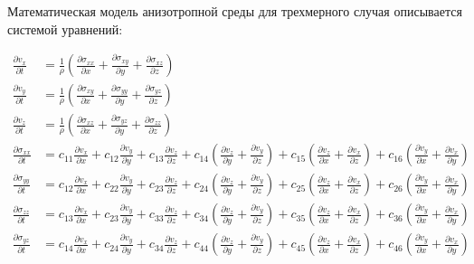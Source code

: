 	Математическая модель анизотропной среды для трехмерного случая описывается системой уравнений\cite{favorskaya}:
\begin{small}
\begin{align}
	\label{anisotropic_equations}
	\frac{\partial{v_x}}{\partial{t}}&=\frac{1}{\rho}(\frac{\partial{\sigma_{xx}}}{\partial{x}}+\frac{\partial{\sigma_{xy}}}{\partial{y}}+\frac{\partial{\sigma_{xz}}}{\partial{z}})
	\nonumber\\
	\frac{\partial{v_y}}{\partial{t}}&=\frac{1}{\rho}(\frac{\partial{\sigma_{xy}}}{\partial{x}}+\frac{\partial{\sigma_{yy}}}{\partial{y}}+\frac{\partial{\sigma_{yz}}}{\partial{z}})
	\nonumber\\
	\frac{\partial{v_z}}{\partial{t}}&=\frac{1}{\rho}(\frac{\partial{\sigma_{xz}}}{\partial{x}}+\frac{\partial{\sigma_{yz}}}{\partial{y}}+\frac{\partial{\sigma_{zz}}}{\partial{z}})
	\nonumber\\
	\frac{\partial{\sigma_{xx}}}{\partial{t}}&=c_{11}\frac{\partial{v_x}}{\partial{x}}+c_{12}\frac{\partial{v_y}}{\partial{y}}+c_{13}\frac{\partial{v_z}}{\partial{z}}+c_{14}(\frac{\partial{v_z}}{\partial{y}}+\frac{\partial{v_y}}{\partial{z}})+c_{15}(\frac{\partial{v_z}}{\partial{x}}+\frac{\partial{v_x}}{\partial{z}})+c_{16}(\frac{\partial{v_y}}{\partial{x}}+\frac{\partial{v_x}}{\partial{y}})
	\nonumber\\
	\frac{\partial{\sigma_{yy}}}{\partial{t}}&=c_{12}\frac{\partial{v_x}}{\partial{x}}+c_{22}\frac{\partial{v_y}}{\partial{y}}+c_{23}\frac{\partial{v_z}}{\partial{z}}+c_{24}(\frac{\partial{v_z}}{\partial{y}}+\frac{\partial{v_y}}{\partial{z}})+c_{25}(\frac{\partial{v_z}}{\partial{x}}+\frac{\partial{v_x}}{\partial{z}})+c_{26}(\frac{\partial{v_y}}{\partial{x}}+\frac{\partial{v_x}}{\partial{y}})
	\nonumber\\
	\frac{\partial{\sigma_{zz}}}{\partial{t}}&=c_{13}\frac{\partial{v_x}}{\partial{x}}+c_{23}\frac{\partial{v_y}}{\partial{y}}+c_{33}\frac{\partial{v_z}}{\partial{z}}+c_{34}(\frac{\partial{v_z}}{\partial{y}}+\frac{\partial{v_y}}{\partial{z}})+c_{35}(\frac{\partial{v_z}}{\partial{x}}+\frac{\partial{v_x}}{\partial{z}})+c_{36}(\frac{\partial{v_y}}{\partial{x}}+\frac{\partial{v_x}}{\partial{y}})
	\nonumber\\
	\frac{\partial{\sigma_{yz}}}{\partial{t}}&=c_{14}\frac{\partial{v_x}}{\partial{x}}+c_{24}\frac{\partial{v_y}}{\partial{y}}+c_{34}\frac{\partial{v_z}}{\partial{z}}+c_{44}(\frac{\partial{v_z}}{\partial{y}}+\frac{\partial{v_y}}{\partial{z}})+c_{45}(\frac{\partial{v_z}}{\partial{x}}+\frac{\partial{v_x}}{\partial{z}})+c_{46}(\frac{\partial{v_y}}{\partial{x}}+\frac{\partial{v_x}}{\partial{y}})

\end{align}
\end{small}
